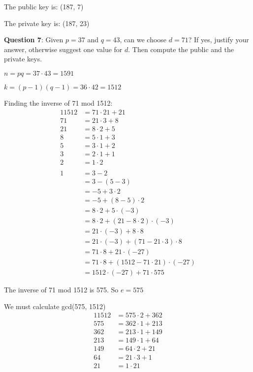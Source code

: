 \documentclass{article} %
\newcommand{\question}[2][]{\begin{flushleft}
        \textbf{Question #1}: #2

\end{flushleft}}
\begin{document}
    The public key is: (187, 7)

    The private key is: (187, 23)

    \newpage

    \question[7]{Given $p = 37$ and $q = 43$, can we choose $d = 71$? If yes, justify your answer, 
    otherwise suggest one value for $d$. Then compute the public and the private keys.}

    $n = pq = 37 \cdot 43 = 1591$

    $k = (p-1)(q-1) = 36 \cdot 42 = 1512$

    Finding the inverse of 71 mod 1512:
    \begin{alignat*}{1}
        1512 &= 71 \cdot 21 + 21\\
        71   &= 21 \cdot 3 + 8\\
        21   &= 8 \cdot 2 + 5\\
        8    &= 5 \cdot 1 + 3\\
        5    &= 3 \cdot 1 + 2\\
        3    &= 2 \cdot 1 + 1\\
        2    &= 1 \cdot 2\\
        \\
        1 &= 3 - 2\\
          &= 3 - (5 - 3)\\
          &= -5 + 3 \cdot 2\\
          &= -5 + (8 - 5) \cdot 2\\
          &= 8 \cdot 2 + 5 \cdot (-3)\\
          &= 8 \cdot 2 + (21 - 8 \cdot 2) \cdot (-3)\\
          &= 21 \cdot (-3) + 8 \cdot 8\\
          &= 21 \cdot (-3) + (71 - 21 \cdot 3) \cdot 8\\
          &= 71 \cdot 8 + 21 \cdot (-27)\\
          &= 71 \cdot 8 + (1512 - 71 \cdot 21) \cdot (-27)\\
          &= 1512 \cdot (-27) + 71 \cdot 575
    \end{alignat*}

    The inverse of 71 mod 1512 is 575. So $e = 575$ 

    We must calculate gcd(575, 1512)
    \begin{alignat*}{1}
        1512 &= 575 \cdot 2 + 362\\
        575 &= 362 \cdot 1 + 213\\
        362 &= 213 \cdot 1 + 149\\
        213 &= 149 \cdot 1 + 64\\
        149 &= 64 \cdot 2 + 21\\
        64 &= 21 \cdot 3 + 1\\
        21 &= 1 \cdot 21
    \end{alignat*}
\end{document}
